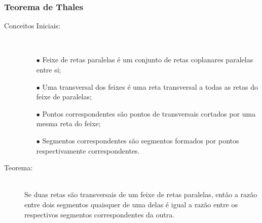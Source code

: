     \subsubsection{Teorema de Thales}
        \begin{description}
            \item[Conceitos Iniciais:] \hfill \\
                \begin{itemize}
                    \item[$\bullet$] Feixe de retas paralelas é um conjunto de retas coplanares paralelas entre si;
                    \item[$\bullet$] Uma transversal dos feixes é uma reta transversal a todas as retas do feixe de paralelas;
                    \item[$\bullet$] Pontos correspondentes são pontos de transversais cortados por uma mesma reta do feixe;
                    \item[$\bullet$] Segmentos correspondentes são segmentos formados por pontos respectivamente correspondentes.
                \end{itemize}
            \item[Teorema:] \hfill \\
                Se duas retas são transversais de um feixe de retas paralelas, então a razão entre dois segmentos quaisquer de uma delas é igual a razão entre os respectivos segmentos correspondentes da outra. \eg
                \begin{center}
\end{center}
\end{description}
